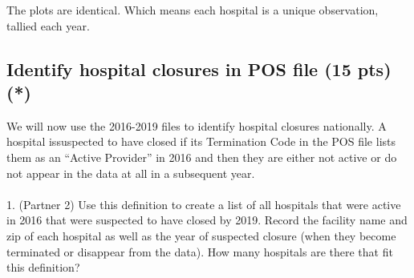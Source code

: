 \documentclass[
  letterpaper,
  DIV=11,
  numbers=noendperiod]{scrartcl}
\makeatletter
\let\oldparagraph\paragraph
\renewcommand{\paragraph}{
    \@ifstar
      \xxxParagraphStar
      \xxxParagraphNoStar
  }
\newcommand{\xxxParagraphStar}[1]{\oldparagraph*{#1}\mbox{}}
\newcommand{\xxxParagraphNoStar}[1]{\oldparagraph{#1}\mbox{}}
\makeatother
\begin{document}
The plots are identical. Which means each hospital is a unique
observation, tallied each year.

\subsection{Identify hospital closures in POS file (15 pts)
(*)}\label{identify-hospital-closures-in-pos-file-15-pts}

We will now use the 2016-2019 files to identify hospital closures
nationally. A hospital issuspected to have closed if its Termination
Code in the POS file lists them as an ``Active Provider'' in 2016 and
then they are either not active or do not appear in the data at all in a
subsequent year.

\paragraph{1. (Partner 2) Use this definition to create a list of all
hospitals that were active in 2016 that were suspected to have closed by
2019. Record the facility name and zip of each hospital as well as the
year of suspected closure (when they become terminated or disappear from
the data). How many hospitals are there that fit this
definition?}\label{partner-2-use-this-definition-to-create-a-list-of-all-hospitals-that-were-active-in-2016-that-were-suspected-to-have-closed-by-2019.-record-the-facility-name-and-zip-of-each-hospital-as-well-as-the-year-of-suspected-closure-when-they-become-terminated-or-disappear-from-the-data.-how-many-hospitals-are-there-that-fit-this-definition}
\end{document}
